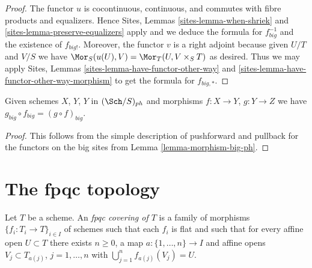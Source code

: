 \begin{proof}
The functor $u$ is cocontinuous, continuous, and commutes with fibre products
and equalizers. Hence
Sites, Lemmas \ref{sites-lemma-when-shriek} and
\ref{sites-lemma-preserve-equalizers}
apply and we deduce the formula
for $f_{big}^{-1}$ and the existence of $f_{big!}$. Moreover,
the functor $v$ is a right adjoint because given $U/T$ and $V/S$
we have $\Mor_S(u(U), V) = \Mor_T(U, V \times_S T)$
as desired. Thus we may apply
Sites, Lemmas \ref{sites-lemma-have-functor-other-way} and
\ref{sites-lemma-have-functor-other-way-morphism} to get the
formula for $f_{big, *}$.
\end{proof}

\begin{lemma}
\label{lemma-composition-ph}
Given schemes $X$, $Y$, $Y$ in $(\Sch/S)_{ph}$
and morphisms $f : X \to Y$, $g : Y \to Z$ we have
$g_{big} \circ f_{big} = (g \circ f)_{big}$.
\end{lemma}

\begin{proof}
This follows from the simple description of pushforward
and pullback for the functors on the big sites from
Lemma \ref{lemma-morphism-big-ph}.
\end{proof}











































\section{The fpqc topology}
\label{section-fpqc}

\begin{definition}
\label{definition-fpqc-covering}
Let $T$ be a scheme. An {\it fpqc covering of $T$} is a family
of morphisms $\{f_i : T_i \to T\}_{i \in I}$ of schemes
such that each $f_i$ is flat and such that for every affine open
$U \subset T$ there exists $n \geq 0$, a map
$a : \{1, \ldots, n\} \to I$ and affine opens
$V_j \subset T_{a(j)}$, $j = 1, \ldots, n$
with $\bigcup_{j = 1}^n f_{a(j)}(V_j) = U$.
\end{definition}

